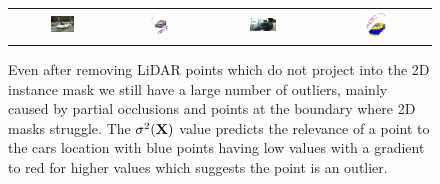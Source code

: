 \begin{figure}
    \centering
    
        
        \begin{tabular}{c c c c}
            \includegraphics[width=0.25\textwidth]{figures/method/output_examples/rgb-1.png} &
            \includegraphics[width=0.25\textwidth]{figures/method/output_examples/pcd-1.png} &
            \includegraphics[width=0.25\textwidth]{figures/method/output_examples/rgb-2.png} &
            \includegraphics[width=0.25\textwidth]{figures/method/output_examples/pcd-2.png}
        \end{tabular}
        \caption{Even after removing LiDAR points which do not project into the 2D instance mask we still have a large number of outliers, mainly caused by partial occlusions and points at the boundary where 2D masks struggle. The $\sigma^2(\mathbf{X})$ value predicts the relevance of a point to the cars location with blue points having low values with a gradient to red for higher values which suggests the point is an outlier.}
    \label{fig:my_label}
\end{figure}
